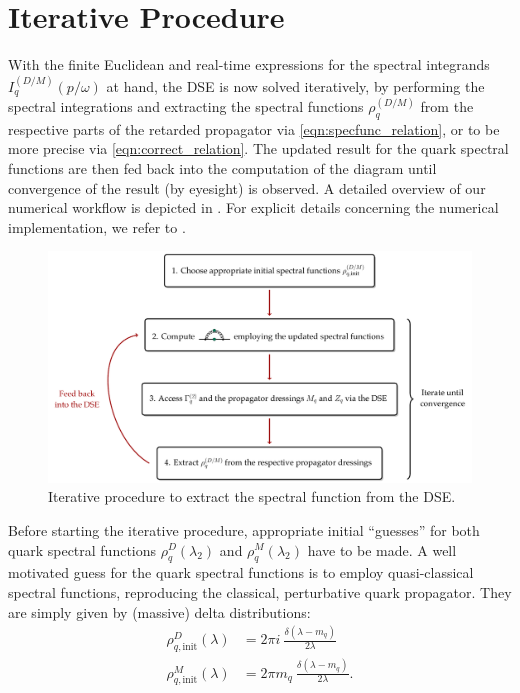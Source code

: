 \section{Iterative Procedure}
With the finite Euclidean and real-time expressions for the spectral integrands $I_q^{(D/M)}(p/\omega)$ at hand, the DSE is now solved iteratively, by performing the spectral integrations and extracting the spectral functions $\rho_q^{(D/M)}$ from the respective parts of the retarded propagator via \eqref{eqn:specfunc_relation}, or to be more precise via \eqref{eqn:correct_relation}. The updated result for the quark spectral functions are then fed back into the computation of the diagram until convergence of the result (by eyesight) is observed. A detailed overview of our numerical workflow is depicted in . For explicit details concerning the numerical implementation, we refer to .\\
\begin{figure}[t]
	\hspace{-4.5em}
	\includegraphics[width = 1.2\textwidth]{figs/tikz/iterative_computation}
	\caption{Iterative procedure to extract the spectral function from the DSE.} 
	\label{fig:numerics}
\end{figure}
Before starting the iterative procedure, appropriate initial \enquote{guesses} for both quark spectral functions $\rho_q^D(\lambda_2)$ and $\rho_q^M(\lambda_2)$ have to be made. A well motivated guess for the quark spectral functions is to employ quasi-classical spectral functions, reproducing  the classical, perturbative quark propagator. They are simply given by (massive) delta distributions:
	\begin{align}
		\rho_{q,\mathrm{init}}^D(\lambda) &= 2\pi i\ \frac{\delta(\lambda-m_q)}{2\lambda}\\
		\rho_{q,\mathrm{init}}^M(\lambda) &= 2\pi m_q\ \frac{\delta(\lambda-m_q)}{2\lambda}.
	\end{align}
